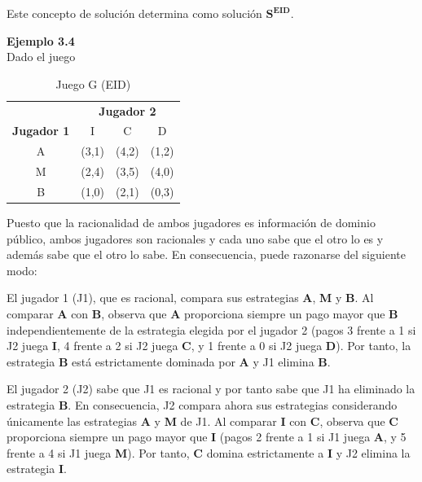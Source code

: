 \documentclass[12pt,a4paper,]{book}
\numberwithin{dummy}{section}
\theoremstyle{ocrenumbox}
\theoremstyle{blacknumex}
\theoremstyle{blacknumbox}
\theoremstyle{ocrenum}
\theoremstyle{ocrenum}
\begin{document}
Este concepto de solución determina como solución \(\mathbf{S^{EID}}\).

\begin{tcolorbox}[colback=blue!10]
\textbf{Ejemplo 3.4} \\

Dado el juego

\begin{table}[H]
\centering
\begin{tabular}{c|ccc}
 & \multicolumn{3}{c}{\textbf{Jugador 2}} \\ 
\textbf{Jugador 1} & I & C & D\\ \hline
A & (3,1) & (4,2) & (1,2)\\
M & (2,4) & (3,5) & (4,0) \\
B & (1,0) & (2,1) & (0,3)
\end{tabular}
\caption{Juego G (EID)}
\label{tab:EID}
\end{table}

Puesto que la racionalidad de ambos jugadores es información de dominio público, ambos jugadores son racionales y cada uno sabe que el otro lo es y además sabe que el otro lo sabe. En consecuencia, puede razonarse del siguiente modo:

El jugador 1 (J1), que es racional, compara sus estrategias \textbf{A}, \textbf{M} y \textbf{B}. Al comparar \textbf{A} con \textbf{B}, observa que \textbf{A} proporciona siempre un pago mayor que \textbf{B} independientemente de la estrategia elegida por el jugador 2 (pagos 3 frente a 1 si J2 juega \textbf{I}, 4 frente a 2 si J2 juega \textbf{C}, y 1 frente a 0 si J2 juega \textbf{D}). Por tanto, la estrategia \textbf{B} está estrictamente dominada por \textbf{A} y J1 elimina \textbf{B}.

El jugador 2 (J2) sabe que J1 es racional y por tanto sabe que J1 ha eliminado la estrategia \textbf{B}. En consecuencia, J2 compara ahora sus estrategias considerando únicamente las estrategias \textbf{A} y \textbf{M} de J1. Al comparar \textbf{I} con \textbf{C}, observa que \textbf{C} proporciona siempre un pago mayor que \textbf{I} (pagos 2 frente a 1 si J1 juega \textbf{A}, y 5 frente a 4 si J1 juega \textbf{M}). Por tanto, \textbf{C} domina estrictamente a \textbf{I} y J2 elimina la estrategia \textbf{I}.

\end{tcolorbox}
\end{document}
